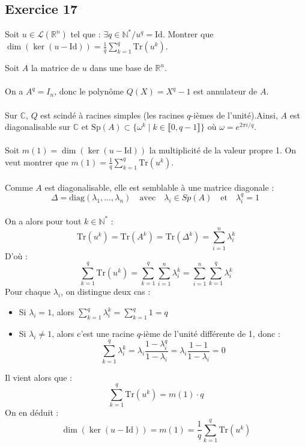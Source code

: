 \documentclass[a4paper,12pt]{article}
\begin{document}
    \subsection*{Exercice 17}
    Soit \( u \in \mathcal{L}(\mathbb{R}^n) \) tel que : \( \exists q \in \mathbb{N}^* / u^q = \mathrm{Id} \). 
    Montrer que \( \dim (\ker (u - \mathrm{Id})) = \frac{1}{q} \sum_{k=1}^{q} \mathrm{Tr}(u^k) \).
    
    \begin{correctionbox}
        Soit \( A \) la matrice de \( u \) dans une base de \( \mathbb{R}^n \). \\ \\
        On a \( A^q = I_n \), donc le polynôme \( Q(X) = X^q - 1 \) est annulateur de \( A \). \\ \\
        Sur \( \mathbb{C} \), \( Q \) est scindé à racines simples (les racines \( q \)-ièmes de l'unité).Ainsi, \( A \) est diagonalisable sur \( \mathbb{C} \) et \( \mathrm{Sp}(A) \subset \{ \omega^k \mid k \in \llbracket 0, q-1 \rrbracket \} \) où \( \omega = e^{2\pi i/q} \). \\ \\
        Soit \( m(1) = \dim(\ker(u - \mathrm{Id})) \) la multiplicité de la valeur propre 1. On veut montrer que \( m(1) = \frac{1}{q} \sum_{k=1}^{q} \mathrm{Tr}(u^k) \). \\ \\
        Comme \( A \) est diagonalisable, elle est semblable à une matrice diagonale :
        \[
        \Delta = \mathrm{diag}(\lambda_1, \dots, \lambda_n) \quad \text{avec} \quad \lambda_i \in Sp(A)\quad \text{et} \quad \lambda_i^q = 1 \    
        \] \\
        On a alors pour tout \( k \in \mathbb{N}^* \) :
        \[
        \mathrm{Tr}(u^k) = \mathrm{Tr}(A^k) = \mathrm{Tr}(\Delta^k) = \sum_{i=1}^n \lambda_i^k
        \]
        D'où :
        \[
        \sum_{k=1}^{q} \mathrm{Tr}(u^k) = \sum_{k=1}^{q} \sum_{i=1}^n \lambda_i^k 
        = \sum_{i=1}^n \sum_{k=1}^{q} \lambda_i^k
        \]
        Pour chaque \( \lambda_i \), on distingue deux cas :
        \begin{itemize}
        \item Si \( \lambda_i = 1 \), alors \( \sum_{k=1}^{q} \lambda_i^k = \sum_{k=1}^{q} 1 = q \)
        \item Si \( \lambda_i \neq 1 \), alors c'est une racine \( q \)-ième de l'unité différente de 1, donc :
        \[
        \sum_{k=1}^{q} \lambda_i^k = \lambda_i \frac{1 - \lambda_i^q}{1 - \lambda_i} = \lambda_i \frac{1 - 1}{1 - \lambda_i} = 0
        \]
        \end{itemize}
        Il vient alors que :
        \[
        \sum_{k=1}^{q} \mathrm{Tr}(u^k) = m(1) \cdot q
        \]
        On en déduit :
        \[
        \dim(\ker(u - \mathrm{Id})) = m(1) = \frac{1}{q} \sum_{k=1}^{q} \mathrm{Tr}(u^k)
        \]
    \end{correctionbox}
\end{document}

